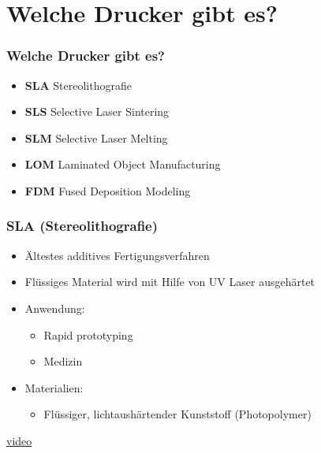 \section{Welche Drucker gibt es?}
\begin{frame}
  \frametitle{Welche Drucker gibt es?}
  \pause
  \begin{itemize}
    \item \textbf{SLA} Stereolithografie \pause
    \item \textbf{SLS} Selective Laser Sintering \pause
    \item \textbf{SLM} Selective Laser Melting \pause
    \item \textbf{LOM} Laminated Object Manufacturing \pause
    \item \textbf{FDM} Fused Deposition Modeling
  \end{itemize}
\end{frame}

\begin{frame}
  \frametitle{SLA (Stereolithografie)}
  \pause
  \begin{itemize}
    \item Ältestes additives Fertigungsverfahren \pause
    \item Flüssiges Material wird mit Hilfe von UV Laser ausgehärtet \pause
    \item Anwendung:
    \begin{itemize}
      \item Rapid prototyping
      \item Medizin \pause
    \end{itemize}
    \item Materialien:
    \begin{itemize}
      \item Flüssiger, lichtaushärtender Kunststoff (Photopolymer) \pause
    \end{itemize}
  \end{itemize}
  \href{https://youtu.be/8a2xNaAkvLo}{video}
\end{frame}

